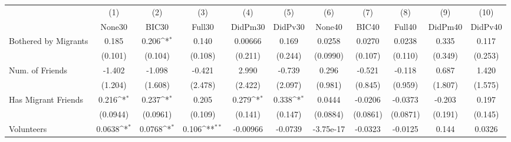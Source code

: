 {
\def\sym#1{\ifmmode^{#1}\else\(^{#1}\)\fi}
\begin{tabular}{l*{10}{c}}
\toprule
            &\multicolumn{1}{c}{(1)}&\multicolumn{1}{c}{(2)}&\multicolumn{1}{c}{(3)}&\multicolumn{1}{c}{(4)}&\multicolumn{1}{c}{(5)}&\multicolumn{1}{c}{(6)}&\multicolumn{1}{c}{(7)}&\multicolumn{1}{c}{(8)}&\multicolumn{1}{c}{(9)}&\multicolumn{1}{c}{(10)}\\
            &\multicolumn{1}{c}{None30}&\multicolumn{1}{c}{BIC30}&\multicolumn{1}{c}{Full30}&\multicolumn{1}{c}{DidPm30}&\multicolumn{1}{c}{DidPv30}&\multicolumn{1}{c}{None40}&\multicolumn{1}{c}{BIC40}&\multicolumn{1}{c}{Full40}&\multicolumn{1}{c}{DidPm40}&\multicolumn{1}{c}{DidPv40}\\
\midrule
Bothered by Migrants&       0.185         &       0.206\sym{*}  &       0.140         &     0.00666         &       0.169         &      0.0258         &      0.0270         &      0.0238         &       0.335         &       0.117         \\
            &     (0.101)         &     (0.104)         &     (0.108)         &     (0.211)         &     (0.244)         &    (0.0990)         &     (0.107)         &     (0.110)         &     (0.349)         &     (0.253)         \\
\addlinespace
Num. of Friends&      -1.402         &      -1.098         &      -0.421         &       2.990         &      -0.739         &       0.296         &      -0.521         &      -0.118         &       0.687         &       1.420         \\
            &     (1.204)         &     (1.608)         &     (2.478)         &     (2.422)         &     (2.097)         &     (0.981)         &     (0.845)         &     (0.959)         &     (1.807)         &     (1.575)         \\
\addlinespace
Has Migrant Friends&       0.216\sym{*}  &       0.237\sym{*}  &       0.205         &       0.279\sym{*}  &       0.338\sym{*}  &      0.0444         &     -0.0206         &     -0.0373         &      -0.203         &       0.197         \\
            &    (0.0944)         &    (0.0961)         &     (0.109)         &     (0.141)         &     (0.147)         &    (0.0884)         &    (0.0861)         &    (0.0871)         &     (0.191)         &     (0.145)         \\
\addlinespace
Volunteers  &      0.0638\sym{*}  &      0.0768\sym{*}  &       0.106\sym{**} &    -0.00966         &     -0.0739         &   -3.75e-17         &     -0.0323         &     -0.0125         &       0.144         &      0.0326         \\

\end{tabular}}

